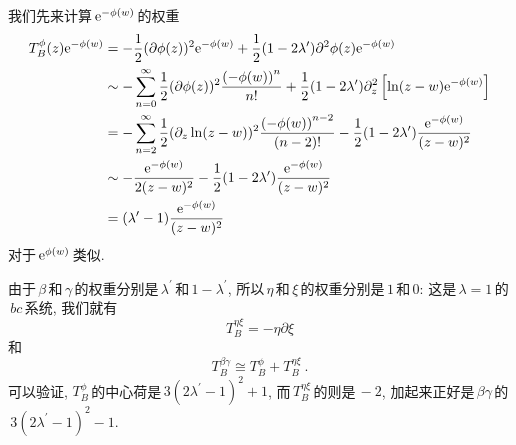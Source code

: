 \begin{tcolorbox}
我们先来计算$\,\mathrm{e}^{-\phi(w)}\,$的权重
\begin{align*}
T_{B}^{\phi }(z)\me^{-\phi (w)} &=-\frac{1}{2}(\partial \phi (z))^{2}\me^{-\phi
(w)}+\frac{1}{2}(1-2\lambda ^{\prime })\partial ^{2}\phi (z)\me^{-\phi (w)} \\
&\sim -\sum_{n=0}^{\infty }\frac{1}{2}(\partial \phi (z))^{2}\frac{\left(
-\phi (w)\right) ^{n}}{n!}+\frac{1}{2}(1-2\lambda ^{\prime })\partial
_{z}^{2}\left[ \ln (z-w)\me^{-\phi (w)}\right]  \\
&=-\sum_{n=2}^{\infty }\frac{1}{2}(\partial _{z}\ln (z-w))^{2}\frac{\left(
-\phi (w)\right) ^{n-2}}{(n-2)!}-\frac{1}{2}(1-2\lambda ^{\prime })\frac{%
\me^{-\phi (w)}}{(z-w)^{2}} \\
&\sim -\frac{\me^{-\phi (w)}}{2(z-w)^{2}}-\frac{1}{2}(1-2\lambda ^{\prime })%
\frac{\me^{-\phi (w)}}{(z-w)^{2}} \\
&=(\lambda ^{\prime }-1)\frac{\me^{-\phi (w)}}{(z-w)^{2}}
\end{align*}
对于$\,\mathrm{e}^{\phi(w)}\,$类似.
\end{tcolorbox}
\noindent 由于$\,\beta\,$和$\,\gamma\,$的权重分别是$\,\lambda^{\prime}\,$和$\,1-\lambda^{\prime}$, 所以$\,\eta\,$和$\,\xi\,$的权重分别是$\,1\,$和\,$0$: 这是$\,\lambda=1\,$的$\,bc\,$系统, 我们就有
\begin{equation}
    T_{B}^{\eta\xi} = -\eta \partial\xi \label{10.4.17}
\end{equation}
和
\begin{equation}
    T_{B}^{\beta\gamma} \cong T_{B}^{\phi} + T_{B}^{\eta\xi} \:. \label{10.4.18}
\end{equation}
可以验证, $T_{B}^{\phi}\,$的中心荷是$\,3(2\lambda^{\prime}-1)^{2}+1$, 而$\,T_{B}^{\eta\xi}\,$的则是$\,-2$, 加起来正好是$\,\beta\gamma\,$的$\,3(2\lambda^{\prime}-1)^{2}-1$.

